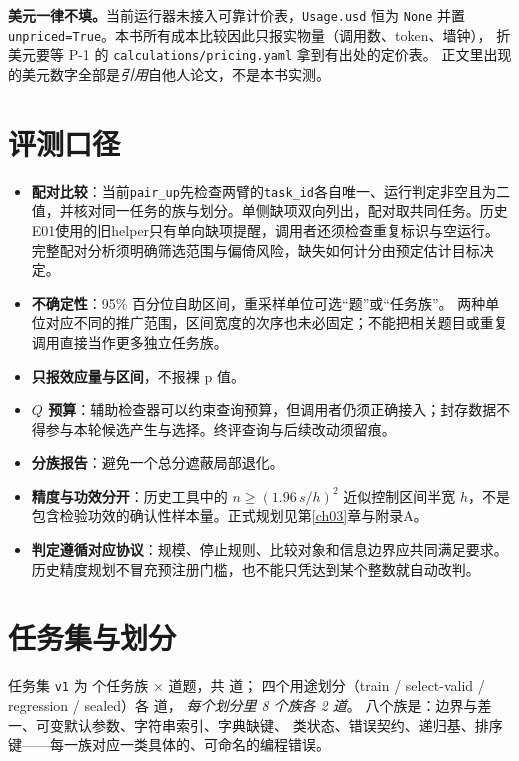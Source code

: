 \begin{sloppypar}
\textbf{美元一律不填。}当前运行器未接入可靠计价表，\texttt{Usage.usd} 恒为 \texttt{None} 并置
\texttt{unpriced=True}。本书所有成本比较因此只报实物量（调用数、token、墙钟），
折美元要等 P-1 的 \texttt{calculations/pricing.yaml} 拿到有出处的定价表。
正文里出现的美元数字全部是\emph{引用}自他人论文，不是本书实测。
\end{sloppypar}

\section{评测口径}
\label{sec:appb-eval}

\begin{itemize}
  \item \textbf{配对比较}：当前\texttt{pair\_up}先检查两臂的\texttt{task\_id}各自唯一、运行判定非空且为二值，并核对同一任务的族与划分。单侧缺项双向列出，配对取共同任务。历史E01使用的旧helper只有单向缺项提醒，调用者还须检查重复标识与空运行。完整配对分析须明确筛选范围与偏倚风险，缺失如何计分由预定估计目标决定。
  \item \textbf{不确定性}：95\% 百分位自助区间，重采样单位可选``题''或``任务族''。
        两种单位对应不同的推广范围，区间宽度的次序也未必固定；不能把相关题目或重复调用直接当作更多独立任务族。
  \item \textbf{只报效应量与区间}，不报裸 p 值。
  \item \textbf{$Q$ 预算}：辅助检查器可以约束查询预算，但调用者仍须正确接入；封存数据不得参与本轮候选产生与选择。终评查询与后续改动须留痕。
  \item \textbf{分族报告}：避免一个总分遮蔽局部退化。
  \item \textbf{精度与功效分开}：历史工具中的 $n\ge(1.96\,s/h)^{2}$ 近似控制区间半宽 $h$，不是包含检验功效的确认性样本量。正式规划见第\ref{ch03}章与附录A。
  \item \textbf{判定遵循对应协议}：规模、停止规则、比较对象和信息边界应共同满足要求。历史精度规划不冒充预注册门槛，也不能只凭达到某个整数就自动改判。
\end{itemize}

\section{任务集与划分}
\label{sec:appb-tasks}

\begin{sloppypar}
任务集 \texttt{v1} 为  个任务族 ×  道题，共  道；
四个用途划分（train / select-valid / regression / sealed）各  道，
\emph{每个划分里 8 个族各 2 道}。
八个族是：边界与差一、可变默认参数、字符串索引、字典缺键、
类状态、错误契约、递归基、排序键——每一族对应一类具体的、可命名的编程错误。
\end{sloppypar}

